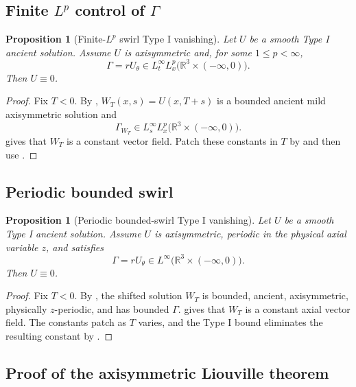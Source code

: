 \documentclass[11pt]{amsart}
\theoremstyle{plain}
\newtheorem{proposition}[theorem]{Proposition}
\theoremstyle{definition}
\theoremstyle{remark}
\numberwithin{equation}{section}
\begin{document}
\subsection{\texorpdfstring{Finite \(L^p\) control of \(\Gamma\)}
{Finite Lp control of Gamma}}

\begin{proposition}[Finite-\(L^p\) swirl Type I vanishing]
\label{prop:lp-swirl-typeI}
Let \(U\) be a smooth Type I ancient solution.  Assume \(U\) is axisymmetric
and, for some \(1\le p<\infty\),
\[
   \Gamma=rU_\theta\in L_t^\infty L_x^p
   \bigl(\mathbb R^3\times(-\infty,0)\bigr).
\]
Then \(U\equiv0\).
\end{proposition}

\begin{proof}
Fix \(T<0\).  By , \(W_T(x,s)=U(x,T+s)\) is a bounded
ancient mild axisymmetric solution and
\[
   \Gamma_{W_T}\in L_s^\infty L_x^p
   \bigl(\mathbb R^3\times(-\infty,0)\bigr).
\]
 gives that \(W_T\) is a constant vector field.  Patch these
constants in \(T\) by  and then use
.
\end{proof}

\subsection{Periodic bounded swirl}

\begin{proposition}[Periodic bounded-swirl Type I vanishing]
\label{prop:periodic-swirl-typeI}
Let \(U\) be a smooth Type I ancient solution.  Assume \(U\) is axisymmetric,
periodic in the physical axial variable \(z\), and satisfies
\[
   \Gamma=rU_\theta\in L^\infty
   \bigl(\mathbb R^3\times(-\infty,0)\bigr).
\]
Then \(U\equiv0\).
\end{proposition}

\begin{proof}
Fix \(T<0\).  By , the shifted solution \(W_T\) is
bounded, ancient, axisymmetric, physically \(z\)-periodic, and has bounded
\(\Gamma\).   gives that \(W_T\) is a constant axial vector
field.  The constants patch as \(T\) varies, and the Type I bound eliminates
the resulting constant by .
\end{proof}

\subsection{Proof of the axisymmetric Liouville theorem}
\end{document}
